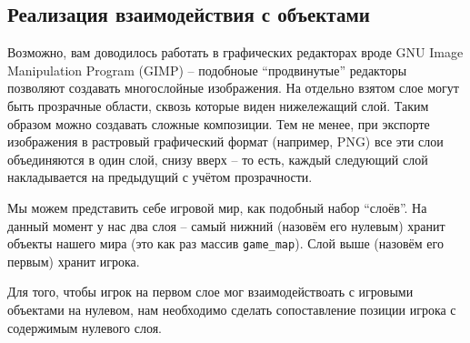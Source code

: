 \documentclass[../sparc.tex]{subfiles}
\begin{document}
\subsection{Реализация взаимодействия с объектами}

Возможно, вам доводилось работать в графических редакторах вроде GNU Image
Manipulation Program (GIMP) -- подобноые ``продвинутые'' редакторы позволяют
создавать многослойные изображения.  На отдельно взятом слое могут быть
прозрачные области, сквозь которые виден нижележащий слой.  Таким образом можно
создавать сложные композиции.  Тем не менее, при экспорте изображения в
растровый графический формат (например, PNG) все эти слои объединяются в один
слой, снизу вверх -- то есть, каждый следующий слой накладывается на предыдущий
с учётом прозрачности.

Мы можем представить себе игровой мир, как подобный набор ``слоёв''.  На данный
момент у нас два слоя -- самый нижний (назовём его нулевым) хранит объекты
нашего мира (это как раз массив \texttt{game\_map}).  Слой выше (назовём его
первым) хранит игрока.

Для того, чтобы игрок на первом слое мог взаимодействоать с игровыми объектами
на нулевом, нам необходимо сделать сопоставление позиции игрока с содержимым
нулевого слоя.
\end{document}
